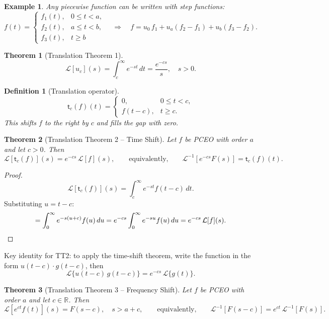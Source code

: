 \documentclass{article}
\newtheorem{theorem}{Theorem}
\newtheorem{definition}{Definition}
\newtheorem*{example}{Example}
\newcommand{\Lap}{\mathcal{L}}
\newcommand{\Linv}{\mathcal{L}^{-1}}
\newcommand{\R}{\mathbb{R}}
\begin{document}
\begin{example}
    Any piecewise function can be written with step functions:
    \[f(t) = \begin{cases}f_1(t),& 0\leq t<a,\\ f_2(t),& a\leq t<b,\\ f_3(t),& t\geq b\end{cases} \quad\Longrightarrow\quad f = u_0\,f_1 + u_a(f_2-f_1) + u_b(f_3-f_2).\]
\end{example}

\begin{theorem}[Translation Theorem 1]
    \[\Lap[u_c](s) = \int_c^\infty e^{-st}\,dt = \frac{e^{-cs}}{s},\quad s > 0.\]
\end{theorem}

\begin{definition}[Translation operator]
    \[\mathsf{t}_c(f)(t) = \begin{cases}0, & 0\leq t<c,\\ f(t-c), & t\geq c.\end{cases}\]
    This shifts $f$ to the right by $c$ and fills the gap with zero.
\end{definition}

\begin{theorem}[Translation Theorem 2 -- Time Shift]
    \label{thm:TT2}
    Let $f$ be PCEO with order $a$ and let $c > 0$. Then
    \[\Lap[\mathsf{t}_c(f)](s) = e^{-cs}\,\Lap[f](s), \qquad\text{equivalently,}\qquad \Linv[e^{-cs}F(s)] = \mathsf{t}_c(f)(t).\]
\end{theorem}

\begin{proof}
    \[\Lap[\mathsf{t}_c(f)](s) = \int_c^\infty e^{-st} f(t-c)\,dt.\]
    Substituting $u = t - c$:
    \[= \int_0^\infty e^{-s(u+c)}f(u)\,du = e^{-cs}\int_0^\infty e^{-su}f(u)\,du = e^{-cs}\,\Lap[f](s). \qedhere\]
\end{proof}

Key identity for TT2: to apply the time-shift theorem, write the function in the form $u(t-c)\cdot g(t-c)$, then
\[\Lap\{u(t-c)\,g(t-c)\} = e^{-cs}\,\Lap\{g(t)\}.\]

\begin{theorem}[Translation Theorem 3 -- Frequency Shift]
    \label{thm:TT3}
    Let $f$ be PCEO with order $a$ and let $c \in \R$. Then
    \[\Lap[e^{ct}f(t)](s) = F(s-c),\quad s > a + c, \qquad\text{equivalently,}\qquad \Linv[F(s-c)] = e^{ct}\,\Linv[F(s)].\]
\end{theorem}
\end{document}
